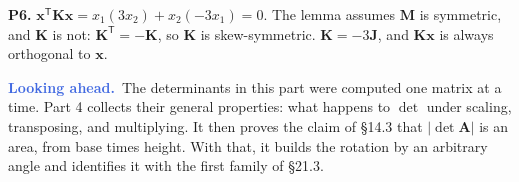 \documentclass[11pt]{article}
\theoremstyle{plain}
\theoremstyle{definition}
\theoremstyle{remark}
\newcommand{\lookahead}{\par\smallskip\noindent
  \textbf{\sffamily\textcolor{RoyalBlue}{Looking ahead.}}\ \ignorespaces}
\newcommand{\vc}[1]{\mathbf{#1}}
\newcommand{\mt}[1]{\mathbf{#1}}
\newcommand{\T}{^{\mathsf{T}}}
\begin{document}
\smallskip
\noindent\textbf{P6.} $\vc{x}\T\mt{K}\vc{x}=x_1(3x_2)+x_2(-3x_1)=0$. The lemma
assumes $\mt{M}$ is symmetric, and $\mt{K}$ is not: $\mt{K}\T=-\mt{K}$, so
$\mt{K}$ is skew-symmetric. $\mt{K}=-3\mt{J}$, and $\mt{K}\vc{x}$ is always
orthogonal to $\vc{x}$.

\lookahead The determinants in this part were computed one matrix at a time.
Part 4 collects their general properties: what happens to $\det$ under scaling,
transposing, and multiplying. It then proves the claim of \S14.3 that
$|\det\mt{A}|$ is an area, from base times height. With that, it builds the
rotation by an arbitrary angle and identifies it with the first family of
\S21.3.
\end{document}
